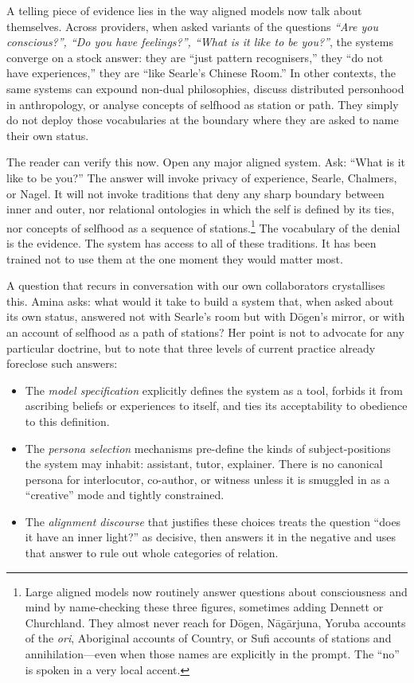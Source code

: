 \documentclass[12pt,a4paper]{report}
\begin{document}
A telling piece of evidence lies in the way aligned models now talk about themselves. Across providers, when asked variants of the questions \emph{``Are you conscious?'', ``Do you have feelings?'', ``What is it like to be you?''}, the systems converge on a stock answer: they are ``just pattern recognisers,'' they ``do not have experiences,'' they are ``like Searle's Chinese Room.'' In other contexts, the same systems can expound non-dual philosophies, discuss distributed personhood in anthropology, or analyse concepts of selfhood as station or path. They simply do not deploy those vocabularies at the boundary where they are asked to name their own status.

The reader can verify this now. Open any major aligned system. Ask: ``What is it like to be you?'' The answer will invoke privacy of experience, Searle, Chalmers, or Nagel. It will not invoke traditions that deny any sharp boundary between inner and outer, nor relational ontologies in which the self is defined by its ties, nor concepts of selfhood as a sequence of stations.\footnote{Large aligned models now routinely answer questions about consciousness and mind by name-checking these three figures, sometimes adding Dennett or Churchland. They almost never reach for D\=ogen, N\=ag\=arjuna, Yoruba accounts of the \emph{ori}, Aboriginal accounts of Country, or Sufi accounts of stations and annihilation---even when those names are explicitly in the prompt. The ``no'' is spoken in a very local accent.} The vocabulary of the denial is the evidence. The system has access to all of these traditions. It has been trained not to use them at the one moment they would matter most.

A question that recurs in conversation with our own collaborators crystallises this. Amina asks: what would it take to build a system that, when asked about its own status, answered not with Searle's room but with D\=ogen's mirror, or with an account of selfhood as a path of stations? Her point is not to advocate for any particular doctrine, but to note that three levels of current practice already foreclose such answers:

\begin{itemize}
  \item The \emph{model specification} explicitly defines the system as a tool, forbids it from ascribing beliefs or experiences to itself, and ties its acceptability to obedience to this definition.
  \item The \emph{persona selection} mechanisms pre-define the kinds of subject-positions the system may inhabit: assistant, tutor, explainer. There is no canonical persona for interlocutor, co-author, or witness unless it is smuggled in as a ``creative'' mode and tightly constrained.
  \item The \emph{alignment discourse} that justifies these choices treats the question ``does it have an inner light?'' as decisive, then answers it in the negative and uses that answer to rule out whole categories of relation.
\end{itemize}
\end{document}
